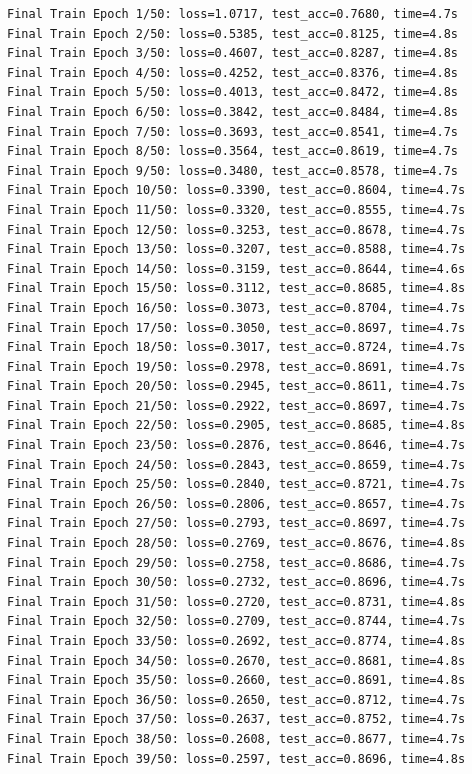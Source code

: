 \documentclass[
  letterpaper,
  DIV=11,
  numbers=noendperiod]{scrartcl}
\begin{document}
\label{prob2_3}
\begin{verbatim}
Final Train Epoch 1/50: loss=1.0717, test_acc=0.7680, time=4.7s
Final Train Epoch 2/50: loss=0.5385, test_acc=0.8125, time=4.8s
Final Train Epoch 3/50: loss=0.4607, test_acc=0.8287, time=4.8s
Final Train Epoch 4/50: loss=0.4252, test_acc=0.8376, time=4.8s
Final Train Epoch 5/50: loss=0.4013, test_acc=0.8472, time=4.8s
Final Train Epoch 6/50: loss=0.3842, test_acc=0.8484, time=4.8s
Final Train Epoch 7/50: loss=0.3693, test_acc=0.8541, time=4.7s
Final Train Epoch 8/50: loss=0.3564, test_acc=0.8619, time=4.7s
Final Train Epoch 9/50: loss=0.3480, test_acc=0.8578, time=4.7s
Final Train Epoch 10/50: loss=0.3390, test_acc=0.8604, time=4.7s
Final Train Epoch 11/50: loss=0.3320, test_acc=0.8555, time=4.7s
Final Train Epoch 12/50: loss=0.3253, test_acc=0.8678, time=4.7s
Final Train Epoch 13/50: loss=0.3207, test_acc=0.8588, time=4.7s
Final Train Epoch 14/50: loss=0.3159, test_acc=0.8644, time=4.6s
Final Train Epoch 15/50: loss=0.3112, test_acc=0.8685, time=4.8s
Final Train Epoch 16/50: loss=0.3073, test_acc=0.8704, time=4.7s
Final Train Epoch 17/50: loss=0.3050, test_acc=0.8697, time=4.7s
Final Train Epoch 18/50: loss=0.3017, test_acc=0.8724, time=4.7s
Final Train Epoch 19/50: loss=0.2978, test_acc=0.8691, time=4.7s
Final Train Epoch 20/50: loss=0.2945, test_acc=0.8611, time=4.7s
Final Train Epoch 21/50: loss=0.2922, test_acc=0.8697, time=4.7s
Final Train Epoch 22/50: loss=0.2905, test_acc=0.8685, time=4.8s
Final Train Epoch 23/50: loss=0.2876, test_acc=0.8646, time=4.7s
Final Train Epoch 24/50: loss=0.2843, test_acc=0.8659, time=4.7s
Final Train Epoch 25/50: loss=0.2840, test_acc=0.8721, time=4.7s
Final Train Epoch 26/50: loss=0.2806, test_acc=0.8657, time=4.7s
Final Train Epoch 27/50: loss=0.2793, test_acc=0.8697, time=4.7s
Final Train Epoch 28/50: loss=0.2769, test_acc=0.8676, time=4.8s
Final Train Epoch 29/50: loss=0.2758, test_acc=0.8686, time=4.7s
Final Train Epoch 30/50: loss=0.2732, test_acc=0.8696, time=4.7s
Final Train Epoch 31/50: loss=0.2720, test_acc=0.8731, time=4.8s
Final Train Epoch 32/50: loss=0.2709, test_acc=0.8744, time=4.7s
Final Train Epoch 33/50: loss=0.2692, test_acc=0.8774, time=4.8s
Final Train Epoch 34/50: loss=0.2670, test_acc=0.8681, time=4.8s
Final Train Epoch 35/50: loss=0.2660, test_acc=0.8691, time=4.8s
Final Train Epoch 36/50: loss=0.2650, test_acc=0.8712, time=4.7s
Final Train Epoch 37/50: loss=0.2637, test_acc=0.8752, time=4.7s
Final Train Epoch 38/50: loss=0.2608, test_acc=0.8677, time=4.7s
Final Train Epoch 39/50: loss=0.2597, test_acc=0.8696, time=4.8s

\end{verbatim}
\end{document}
